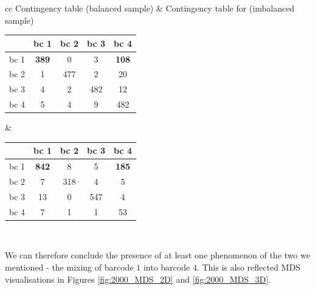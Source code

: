 \begin{tabular}{ cc }%
\label{tab:two_contingencies}
Contingency table (balanced sample) & Contingency table for (imbalanced sample) \\  
\begin{tabular}{c|c|c|c|c}
& bc 1 & bc 2 & bc 3 & bc 4\\
\hline
bc 1 & \textbf{389} & 0 & 3 & \textbf{108}\\
bc 2 & 1 & 477 & 2 & 20\\
bc 3 & 4 & 2 & 482 & 12\\
bc 4 & 5 & 4 & 9 & 482
\end{tabular} &
\begin{tabular}{c|c|c|c|c}
& bc 1 & bc 2 & bc 3 & bc 4\\
\hline
bc 1 & \textbf{842} & 8 & 5 & \textbf{185} \\
bc 2 & 7 & 318 & 4 & 5\\
bc 3 & 13 & 0 & 547 & 4\\
bc 4 & 7 & 1 & 1 & 53 
\end{tabular}\\
\end{tabular}
\bigskip

We can therefore conclude the presence of at least one phenomenon of the two we mentioned - the mixing of barcode $1$ into barcode $4$. This is  also reflected MDS visualisations in Figures \ref{fig:2000_MDS_2D} and \ref{fig:2000_MDS_3D}.



